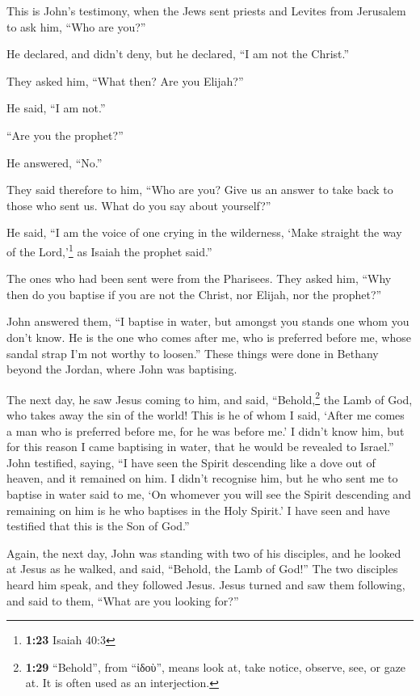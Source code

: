  This is John's testimony, when the Jews sent priests and
Levites from Jerusalem to ask him, ``Who are you?''

 He declared, and didn't deny, but he declared, ``I am
not the Christ.''

 They asked him, ``What then? Are you Elijah?''

He said, ``I am not.''

``Are you the prophet?''

He answered, ``No.''

 They said therefore to him, ``Who are you? Give us an
answer to take back to those who sent us. What do you say about
yourself?''

 He said, ``I am the voice of one crying in the
wilderness, `Make straight the way of the Lord,'\footnote{\textbf{1:23}
  Isaiah 40:3} as Isaiah the prophet said.''

 The ones who had been sent were from the Pharisees.
 They asked him, ``Why then do you baptise if you are not
the Christ, nor Elijah, nor the prophet?''

 John answered them, ``I baptise in water, but amongst
you stands one whom you don't know.  He is the one who
comes after me, who is preferred before me, whose sandal strap I'm not
worthy to loosen.''  These things were done in Bethany
beyond the Jordan, where John was baptising.

 The next day, he saw Jesus coming to him, and said,
``Behold,\footnote{\textbf{1:29} ``Behold'', from ``ἰδοὺ'', means look
  at, take notice, observe, see, or gaze at. It is often used as an
  interjection.} the Lamb of God, who takes away the sin of the world!
 This is he of whom I said, `After me comes a man who is
preferred before me, for he was before me.'  I didn't
know him, but for this reason I came baptising in water, that he would
be revealed to Israel.''  John testified, saying, ``I
have seen the Spirit descending like a dove out of heaven, and it
remained on him.  I didn't recognise him, but he who sent
me to baptise in water said to me, `On whomever you will see the Spirit
descending and remaining on him is he who baptises in the Holy Spirit.'
 I have seen and have testified that this is the Son of
God.''

 Again, the next day, John was standing with two of his
disciples,  and he looked at Jesus as he walked, and
said, ``Behold, the Lamb of God!''  The two disciples
heard him speak, and they followed Jesus.  Jesus turned
and saw them following, and said to them, ``What are you looking for?''

